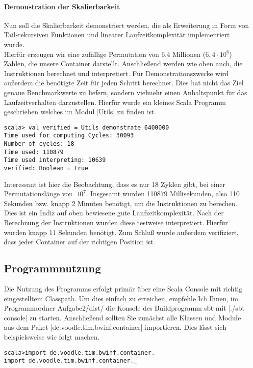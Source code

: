 \paragraph{Demonstration der Skalierbarkeit}
\label{scalability}
Nun soll die Skalierbarkeit demonstriert werden,
die als Erweiterung in Form von Tail-rekursiven Funktionen und linearer Laufzeitkomplexität implementiert wurde.\\
Hierfür erzeugen wir eine zufällige Permutation von 6,4 Millionen ($6,4 \cdot 10^6$) Zahlen, die unsere Container darstellt.
Anschließend werden wie oben auch, die Instruktionen berechnet und interpretiert.
Für Demonstrationszwecke wird außerdem die benötigte Zeit für jeden Schritt berechnet.
Dies hat nicht das Ziel genaue Benchmarkwerte zu liefern, sondern vielmehr einen Anhaltspunkt für das Laufzeitverhalten darzustellen.
Hierfür wurde ein kleines Scala Programm geschrieben welches im Modul |Utils| zu finden ist.
\begin{lstlisting}
scala> val verified = Utils demonstrate 6400000
Time used for computing Cycles: 30093
Number of cycles: 18
Time used: 110879
Time used interpreting: 10639
verified: Boolean = true
\end{lstlisting}
Interessant ist hier die Beobachtung, dass es nur 18 Zyklen gibt, bei einer Permutationslänge von $~10^7$.
Insgesamt wurden 110879 Millisekunden, also 110 Sekunden bzw. knapp 2 Minuten benötigt, um die Instruktionen zu berechen.
Dies ist ein Indiz auf oben bewiesene gute Laufzeitkomplexität.
Nach der Berechnung der Instruktionen wurden diese testweise interpretiert. Hierfür wurden knapp 11 Sekunden benötigt.
Zum Schluß wurde außerdem verifiziert, dass jeder Container auf der richtigen Position ist.

\subsection{Programmnutzung}
\lstset{basicstyle=\ttfamily\small}
Die Nutzung des Programms erfolgt primär über eine Scala Console mit richtig eingestelltem Classpath.
Um dies einfach zu erreichen, empfehle Ich Ihnen, im Programmordner Aufgabe2/dist/ die Konsole des Buildprogramm sbt mit |./sbt console| zu starten.
Anschließend sollten Sie zunächst alle Klassen und Module aus dem Paket |de.voodle.tim.bwinf.container| importieren. Dies lässt sich beispielsweise wie folgt machen.
\begin{lstlisting}
scala>import de.voodle.tim.bwinf.container._
import de.voodle.tim.bwinf.container._
\end{lstlisting}

